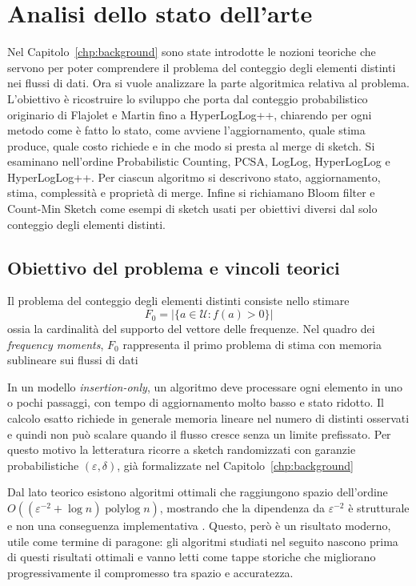 \chapter{Analisi dello stato dell'arte}
\label{chp:stato-arte}

Nel Capitolo~\ref{chp:background} sono state introdotte le nozioni teoriche che
servono per poter comprendere il problema del conteggio degli elementi distinti nei flussi di dati.
Ora si vuole analizzare la parte algoritmica relativa al problema. L'obiettivo è ricostruire lo
sviluppo che porta dal conteggio probabilistico originario di Flajolet e Martin
fino a HyperLogLog++, chiarendo per ogni metodo come è fatto lo stato, come
avviene l'aggiornamento, quale stima produce, quale costo richiede e in che modo
si presta al merge di sketch. Si esaminano nell'ordine Probabilistic Counting,
PCSA, LogLog, HyperLogLog e HyperLogLog++. Per ciascun algoritmo si descrivono
stato, aggiornamento, stima, complessità e proprietà di merge. Infine si
richiamano Bloom filter e Count-Min Sketch come esempi di sketch usati per
obiettivi diversi dal solo conteggio degli elementi distinti.

\section{Obiettivo del problema e vincoli teorici}
Il problema del conteggio degli elementi distinti consiste nello stimare
\[
F_0 = |\{a\in\mathcal{U} : f(a)>0\}|
\]
ossia la cardinalità del supporto del vettore delle frequenze. Nel quadro dei
\emph{frequency moments}, $F_0$ rappresenta il primo problema di stima
con memoria sublineare sui flussi di dati
\cite{Alon_Matias_Szegedy_2002,BarYossef_Jayram_Kumar_Sivakumar_Trevisan_2002}

In un modello \textit{insertion-only}, un algoritmo deve processare ogni elemento in
uno o pochi passaggi, con tempo di aggiornamento molto basso e stato ridotto. Il
calcolo esatto richiede in generale memoria lineare nel numero di distinti
osservati e quindi non può scalare quando il flusso cresce senza un limite
prefissato. Per questo motivo la letteratura ricorre a sketch randomizzati con
garanzie probabilistiche $(\varepsilon,\delta)$, già formalizzate nel
Capitolo~\ref{chp:background}

Dal lato teorico esistono algoritmi ottimali che raggiungono spazio dell'ordine
$O((\varepsilon^{-2} + \log n)\operatorname{polylog} n)$, mostrando che la
dipendenza da $\varepsilon^{-2}$ è strutturale e non una conseguenza
implementativa \cite{Kane_Nelson_Woodruff_2010}. Questo, però è un risultato
moderno, utile come termine di paragone: gli algoritmi studiati nel seguito
nascono prima di questi risultati ottimali e vanno letti come tappe storiche
che migliorano progressivamente il compromesso tra spazio e accuratezza.

